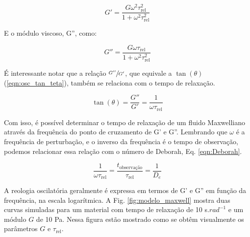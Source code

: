 			\begin{equation}
				G' = \dfrac{ G \omega^2 \tau_{\textrm{rel}}^2   }{  1 + \omega^2 \tau_{\textrm{rel}}^2      }
				\label{eqn:Maxwell_G1_def}
			\end{equation} 
			
			E o módulo viscoso, G'', como:
			
			\begin{equation}
				G'' = \dfrac{  G \omega  \tau_{\textrm{rel}}        }{ 1 + \omega^2 \tau_{\textrm{rel}}^2 }
				\label{eqn:Maxwell_G2_def}
			\end{equation} 
			
			É interessante notar que a relação \(\sfrac{G''}{G'}\), que equivale a \(\tan(\theta)\) (\ref{eqn:osc_tan_teta}), também se relaciona com o tempo de relaxação. 
			
			\begin{equation}
				\tan(\theta) = \dfrac{G''}{G'} = \dfrac{1}{\omega\tau_{\textrm{rel}}}
				\label{eqn:Maxwell_cruzamento}
			\end{equation}  %
			
			Com isso, é possível determinar o tempo de relaxação de um fluido Maxwelliano através da frequência do ponto de cruzamento de G' e G''. Lembrando que \(\omega\) é a frequência de perturbação, e o inverso da frequência é o tempo de observação, podemos relacionar essa relação com o número de Deborah, Eq. \ref{eqn:Deborah}.
			
			\begin{equation}
				\dfrac{1}{\omega\tau_{\textrm{rel}}} = \dfrac{ t_{\textrm{observação}  }}{ \tau_{\textrm{rel}}  } = \dfrac{1}{D_e}
				\label{eqn:Maxwell_cruzamento_Deborah}
			\end{equation} 

			A reologia oscilatória geralmente é expressa em termos de G' e G'' em função da frequência, na escala logarítmica. A Fig. \ref{fig:modelo_maxwell} mostra duas curvas simuladas para um material com tempo de relaxação de 10 s.$rad^{-1}$ e um módulo \(G\) de 10 Pa. Nessa figura estão mostrado como se obtêm visualmente os parâmetros \(G\) e \(\tau_{\mathrm{rel}}\).
			
